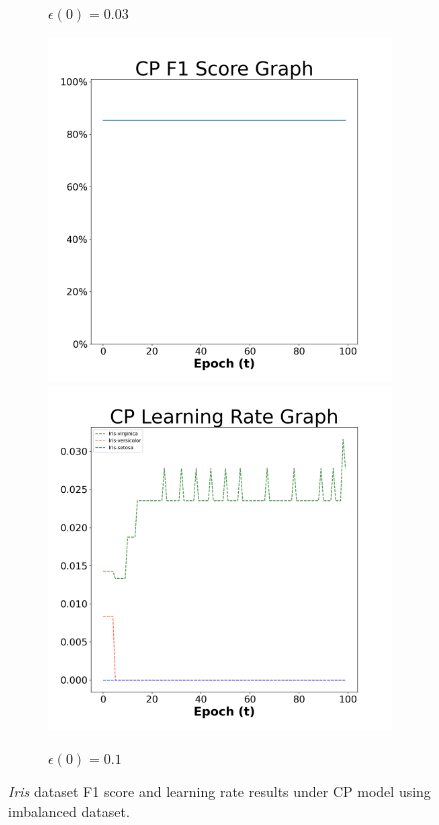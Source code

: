 \begin{figure}[H]
\begin{subfigure}{0.3\textwidth}
  \caption{$\epsilon(0)=0.03$}
\end{subfigure}\hfil %
\begin{subfigure}{0.3\textwidth}
  \includegraphics[width=\linewidth]{images/exper2/iris/CP_0.1_f1.png}
  \includegraphics[width=\linewidth]{images/exper2/iris/CP_0.1_lr.png}
  \caption{$\epsilon(0)=0.1$}
\end{subfigure}

\caption{\textit{Iris} dataset F1 score and learning rate results under CP model using imbalanced dataset.}
\end{figure}

